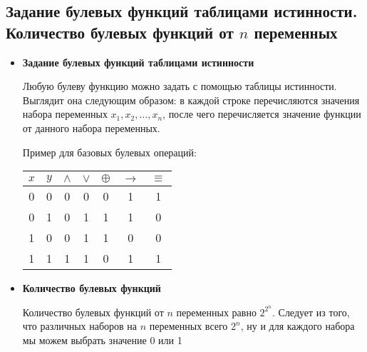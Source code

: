 \subsection{Задание булевых функций таблицами истинности. Количество булевых функций от $n$ переменных}

\begin{itemize}
	\item \textbf{Задание булевых функций таблицами истинности}

	Любую булеву функцию можно задать с помощью таблицы истинности. Выглядит она следующим образом: в каждой строке перечисляются значения набора переменных $x_1, x_2, \ldots, x_n$, после чего перечисляется значение функции от данного набора переменных.
	
	Пример для базовых булевых операций:

   \begin{tabular}{|c|c|c|c|c|c|c|}
       \hline
       $x$ & $y$ & $\wedge$ & $\vee$ & $\oplus$ & $\to$ & $\equiv$\\
       \hline
       0 & 0 & 0 & 0 & 0 & 1 & 1 \\
       \hline
       0 & 1 & 0 & 1 & 1 & 1 & 0 \\
       \hline
       1 & 0 & 0 & 1 & 1 & 0 & 0 \\
       \hline
       1 & 1 & 1 & 1 & 0 & 1 & 1 \\
       \hline
   \end{tabular}

	\item \textbf{Количество булевых функций}
	
	Количество булевых функций от $n$ переменных равно $2^{2^n}$. Следует из того, что различных наборов на $n$ переменных всего $2^n$, ну и для каждого набора мы можем выбрать значение 0 или 1
\end{itemize}